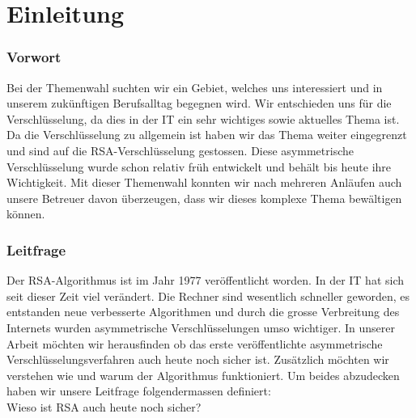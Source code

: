 \part{Einleitung}
\section{Vorwort}
Bei der Themenwahl suchten wir ein Gebiet, welches uns interessiert und in unserem zukünftigen Berufsalltag begegnen wird. Wir entschieden uns für die Verschlüsselung, da dies in der IT ein sehr wichtiges sowie aktuelles Thema ist. Da die Verschlüsselung zu allgemein ist haben wir das Thema weiter eingegrenzt und sind auf die RSA-Verschlüsselung gestossen. Diese asymmetrische Verschlüsselung wurde schon relativ früh entwickelt und behält bis heute ihre Wichtigkeit. Mit dieser Themenwahl konnten wir nach mehreren Anläufen auch unsere Betreuer davon überzeugen, dass wir dieses komplexe Thema bewältigen können. 
%
\section{Leitfrage}
Der RSA-Algorithmus ist im Jahr 1977 veröffentlicht worden. In der IT hat sich seit dieser Zeit viel verändert. Die Rechner sind wesentlich schneller geworden, es entstanden neue verbesserte Algorithmen und durch die grosse Verbreitung des Internets wurden asymmetrische Verschlüsselungen umso wichtiger. In unserer Arbeit möchten wir herausfinden ob das erste veröffentlichte asymmetrische Verschlüsselungsverfahren auch heute noch sicher ist. Zusätzlich möchten wir verstehen wie und warum der Algorithmus funktioniert. Um beides abzudecken haben wir unsere Leitfrage folgendermassen definiert:\\
Wieso ist RSA auch heute noch sicher?